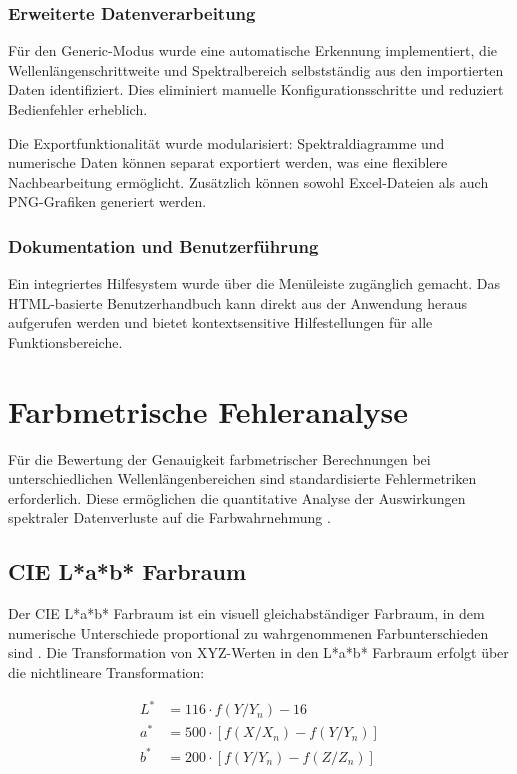 \subsubsection{Erweiterte Datenverarbeitung}

Für den Generic-Modus wurde eine automatische Erkennung implementiert, die Wellenlängenschrittweite und Spektralbereich selbstständig aus den importierten Daten identifiziert. Dies eliminiert manuelle Konfigurationsschritte und reduziert Bedienfehler erheblich.

Die Exportfunktionalität wurde modularisiert: Spektraldiagramme und numerische Daten können separat exportiert werden, was eine flexiblere Nachbearbeitung ermöglicht. Zusätzlich können sowohl Excel-Dateien als auch PNG-Grafiken generiert werden.

\subsubsection{Dokumentation und Benutzerführung}

Ein integriertes Hilfesystem wurde über die Menüleiste zugänglich gemacht. Das HTML-basierte Benutzerhandbuch kann direkt aus der Anwendung heraus aufgerufen werden und bietet kontextsensitive Hilfestellungen für alle Funktionsbereiche.

\section{Farbmetrische Fehleranalyse}

Für die Bewertung der Genauigkeit farbmetrischer Berechnungen bei unterschiedlichen Wellenlängenbereichen sind standardisierte Fehlermetriken erforderlich. Diese ermöglichen die quantitative Analyse der Auswirkungen spektraler Datenverluste auf die Farbwahrnehmung \parencite{CIE15:2018, Fairchild2013}.

\subsection{CIE L*a*b* Farbraum}

Der CIE L*a*b* Farbraum ist ein visuell gleichabständiger Farbraum, in dem numerische Unterschiede proportional zu wahrgenommenen Farbunterschieden sind \parencite{CIE15:2018, CIELAB1976}. Die Transformation von XYZ-Werten in den L*a*b* Farbraum erfolgt über die nichtlineare Transformation:

\begin{align}
L^* &= 116 \cdot f(Y/Y_n) - 16 \label{eq:lab_l}\\
a^* &= 500 \cdot [f(X/X_n) - f(Y/Y_n)] \label{eq:lab_a}\\
b^* &= 200 \cdot [f(Y/Y_n) - f(Z/Z_n)] \label{eq:lab_b}
\end{align}

